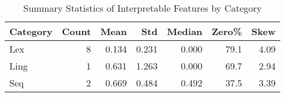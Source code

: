 \begin{table}[htbp]
\centering
\caption{Summary Statistics of Interpretable Features by Category}
\label{tab:feature_summary}
\begin{tabular}{lrrrrrr}
\toprule
Category & Count & Mean & Std & Median & Zero\% & Skew \\
\midrule
Lex & 8 & 0.134 & 0.231 & 0.000 & 79.1 & 4.09 \\
Ling & 1 & 0.631 & 1.263 & 0.000 & 69.7 & 2.94 \\
Seq & 2 & 0.669 & 0.484 & 0.492 & 37.5 & 3.39 \\
\bottomrule
\end{tabular}
\end{table}
